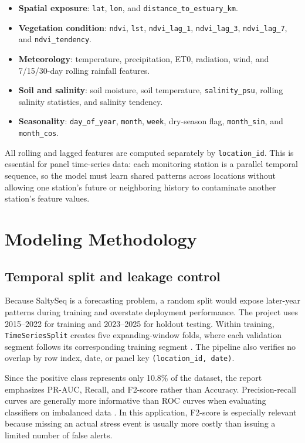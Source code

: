 \documentclass[a4paper, 11pt]{article}
\begin{document}
\begin{itemize}[leftmargin=1.2em, itemsep=1pt]
    \item \textbf{Spatial exposure}: \texttt{lat}, \texttt{lon}, and \texttt{distance\_to\_estuary\_km}.
    \item \textbf{Vegetation condition}: \texttt{ndvi}, \texttt{lst}, \texttt{ndvi\_lag\_1}, \texttt{ndvi\_lag\_3}, \texttt{ndvi\_lag\_7}, and \texttt{ndvi\_tendency}.
    \item \textbf{Meteorology}: temperature, precipitation, ET0, radiation, wind, and 7/15/30-day rolling rainfall features.
    \item \textbf{Soil and salinity}: soil moisture, soil temperature, \texttt{salinity\_psu}, rolling salinity statistics, and salinity tendency.
    \item \textbf{Seasonality}: \texttt{day\_of\_year}, \texttt{month}, \texttt{week}, dry-season flag, \texttt{month\_sin}, and \texttt{month\_cos}.
\end{itemize}

All rolling and lagged features are computed separately by \texttt{location\_id}. This is essential for panel time-series data: each monitoring station is a parallel temporal sequence, so the model must learn shared patterns across locations without allowing one station's future or neighboring history to contaminate another station's feature values.

\section{Modeling Methodology}

\subsection{Temporal split and leakage control}

Because SaltySeq is a forecasting problem, a random split would expose later-year patterns during training and overstate deployment performance. The project uses 2015--2022 for training and 2023--2025 for holdout testing. Within training, \texttt{TimeSeriesSplit} creates five expanding-window folds, where each validation segment follows its corresponding training segment \cite{sklearn-tscv}. The pipeline also verifies no overlap by row index, date, or panel key \texttt{(location\_id, date)}.

Since the positive class represents only 10.8\% of the dataset, the report emphasizes PR-AUC, Recall, and F2-score rather than Accuracy. Precision-recall curves are generally more informative than ROC curves when evaluating classifiers on imbalanced data \cite{saito2015}. In this application, F2-score is especially relevant because missing an actual stress event is usually more costly than issuing a limited number of false alerts.
\end{document}
